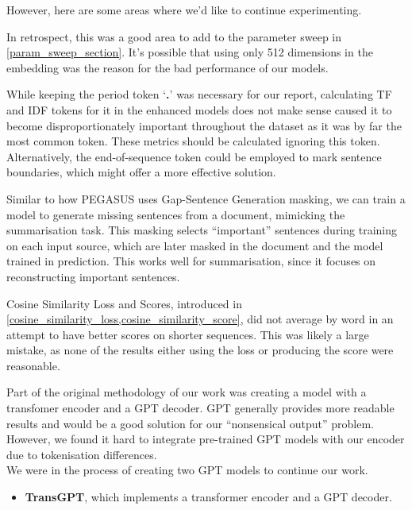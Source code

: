 However, here are some areas where we'd like to continue experimenting.
\begin{description}[style=nextline,itemsep=10pt]
	\item[Embedding Size]
		In retrospect, this was a good area to add to the parameter sweep in \cref{param_sweep_section}.
		It's possible that using only 512 dimensions in the embedding was the reason for the bad performance of our models.
	\item[TF and IDF tokens in the period token]
		While keeping the period token `\textbf{.}' was necessary for our report, calculating TF and IDF tokens for it in the enhanced models does not make sense caused it to become disproportionately important throughout the dataset as it was by far the most common token.
		These metrics should be calculated ignoring this token.
		Alternatively, the end-of-sequence token could be employed to mark sentence boundaries, which might offer a more effective solution.
	\item[Novel uses of masking]
		Similar to how PEGASUS uses Gap-Sentence Generation masking\cite{pegasus_model}, we can train a model to generate missing sentences from a document, mimicking the summarisation task.
		This masking selects ``important'' sentences during training on each input source, which are later masked in the document and the model trained in prediction.
		This works well for summarisation, since it focuses on reconstructing important sentences.
	\item[Non-novel uses of cosine similarity score and loss]
		Cosine Similarity Loss and Scores, introduced in \cref{cosine_similarity_loss,cosine_similarity_score}, did not average by word in an attempt to have better scores on shorter sequences.
		This was likely a large mistake, as none of the results either using the loss or producing the score were reasonable.
	\item[Using a GPT decoder]
		Part of the original methodology of our work was creating a model with a transfomer encoder and a GPT decoder.
		GPT generally provides more readable results and would be a good solution for our ``nonsensical output'' problem.
		However, we found it hard to integrate pre-trained GPT models with our encoder due to tokenisation differences. \\
		We were in the process of creating two GPT models to continue our work.
		\begin{itemize}
			\item \textbf{TransGPT}, which implements a transformer encoder and a GPT decoder.

\end{itemize}
\end{description}
